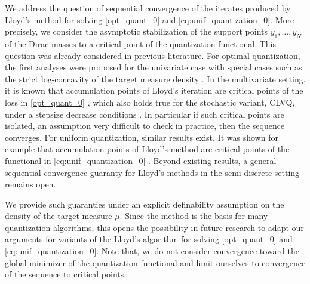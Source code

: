 \documentclass[11pt]{article}
\newcommand{\1}{\mathbbm{1}}
\numberwithin{equation}{section}
\begin{document}
We address the question of sequential convergence of the iterates produced by Lloyd's method for solving \eqref{opt_quant_0} and \eqref{eq:unif_quantization_0}. More precisely, we consider the asymptotic stabilization of the support points $y_1,\ldots, y_N$ of the Dirac masses to a critical point of the quantization functional. This question was already considered in previous literature.
For optimal quantization, the first analyses were proposed for the univariate case \cite{Lloydoptimallocalcv,kieffer1982exponential} with special cases such as the strict log-concavity of the target measure density \cite{Lloydoptcvonedimlogconcave1,Lloydoptcvonedimlogconcave2}. In the multivariate setting, it is known that accumulation points of Lloyd's iteration are critical points of the loss in \eqref{opt_quant_0} \cite{LloydCVT,nondegeneracyLloyd,cvlloydanydimpages}, which also holds true for the stochastic variant, CLVQ, under a stepsize decrease conditions \cite{pages1998space}. In particular if such critical points are isolated, an assumption very difficult to check in practice, then the sequence converges. 
For uniform quantization, similar results exist. It was shown for example that accumulation points of Lloyd's method are critical points of the functional in \eqref{eq:unif_quantization_0} \cite{nonassymptotic}. Beyond existing results, a general sequential convergence guaranty for Lloyd's methods in the semi-discrete setting remains open. 

 We provide such guaranties under an explicit definability assumption on the density of the target measure $\mu$. Since the method is the basis for many quantization algorithms, this opens the possibility in future research to adapt our arguments for variants of the Lloyd's algorithm for solving  \eqref{opt_quant_0} and \eqref{eq:unif_quantization_0}.
Note that, we do not consider convergence toward the global minimizer of the quantization functional and limit ourselves to convergence of the sequence to critical points.
\end{document}
